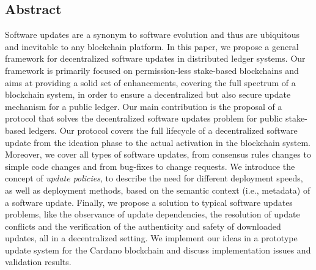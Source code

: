\subsection*{Abstract}
Software updates are a synonym to software evolution and thus are ubiquitous and inevitable to any blockchain platform. In this paper, we propose a general framework for decentralized software updates in distributed ledger systems. Our framework is primarily focused on permission-less stake-based blockchains and aims at providing a solid set of enhancements, covering the full spectrum of a blockchain system, in order to ensure a decentralized but also secure update mechanism for a public ledger. 
Our main contribution is the proposal of a protocol that solves the decentralized software updates problem for public stake-based ledgers. Our protocol covers the full lifecycle of a decentralized software update from the ideation phase to the actual activation in the blockchain system. Moreover, we cover all types of software updates, from consensus rules changes to simple code changes and from bug-fixes to change requests. We introduce the concept of \emph{update policies}, to describe the need for different deployment speeds, as well as deployment methods, based on the semantic context (i.e., metadata) of a software update. Finally, we propose a solution to typical software updates problems, like the observance of update dependencies, the resolution of update conflicts and the verification of the authenticity and safety of downloaded updates, all in a decentralized setting. We implement our ideas in a prototype update system for the Cardano blockchain and discuss implementation issues and validation results.



